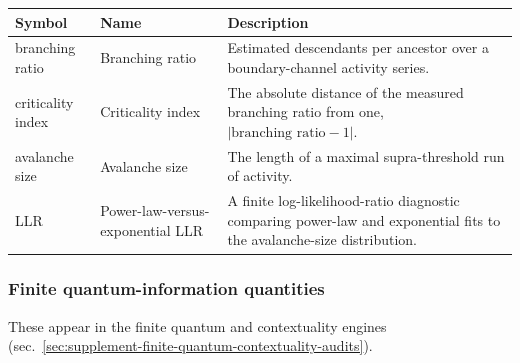 \documentclass[
]{article}
\newcounter{none} %
\begin{document}
{\def\LTcaptype{none} %
\begin{longtable}[]{@{}
  >{\raggedright\arraybackslash}p{}
  >{\raggedright\arraybackslash}p{}
  >{\raggedright\arraybackslash}p{}@{}}
\toprule\noalign{}
\begin{minipage}[b]{\linewidth}\raggedright
Symbol
\end{minipage} & \begin{minipage}[b]{\linewidth}\raggedright
Name
\end{minipage} & \begin{minipage}[b]{\linewidth}\raggedright
Description
\end{minipage} \\
\midrule\noalign{}
\endhead
\bottomrule\noalign{}
\endlastfoot
branching ratio & Branching ratio & Estimated descendants per ancestor
over a boundary-channel activity series. \\
criticality index & Criticality index & The absolute distance of the
measured branching ratio from one,
\(\lvert\text{branching ratio} - 1\rvert\). \\
avalanche size & Avalanche size & The length of a maximal
supra-threshold run of activity. \\
LLR & Power-law-versus-exponential LLR & A finite log-likelihood-ratio
diagnostic comparing power-law and exponential fits to the
avalanche-size distribution. \\
\end{longtable}
}

\subsubsection{Finite quantum-information
quantities}\label{finite-quantum-information-quantities}

These appear in the finite quantum and contextuality engines
(sec.~\ref{sec:supplement-finite-quantum-contextuality-audits}).
\end{document}
